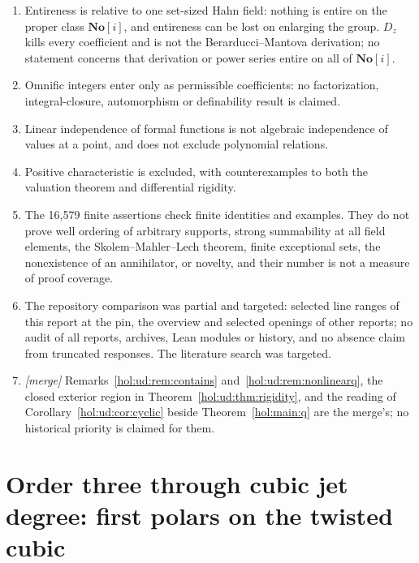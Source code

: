 \documentclass[11pt]{article}
\numberwithin{equation}{section}
\theoremstyle{definition}
\theoremstyle{remark}
\newcommand{\No}{\mathbf{No}}
\begin{document}
\begin{enumerate}[label=\textup{(U\arabic*)}]
operator data (Example~\ref{hol:ud:ex:degree}).
\item Entireness is relative to one set-sized Hahn field: nothing is entire on
the proper class $\No[i]$, and entireness can be lost on enlarging the group.
$D_z$ kills every coefficient and is not the Berarducci--Mantova derivation;
no statement concerns that derivation or power series entire on all of
$\No[i]$.
\item Omnific integers enter only as permissible coefficients: no
factorization, integral-closure, automorphism or definability result is
claimed.
\item Linear independence of formal functions is not algebraic independence
of values at a point, and does not exclude polynomial relations.
\item Positive characteristic is excluded, with counterexamples to both the
valuation theorem and differential rigidity.
\item The 16{,}579 finite assertions check finite identities and examples.
They do not prove well ordering of arbitrary supports, strong summability at
all field elements, the Skolem--Mahler--Lech theorem, finite exceptional sets,
the nonexistence of an annihilator, or novelty, and their number is not a
measure of proof coverage.
\item The repository comparison was partial and targeted: selected line
ranges of this report at the pin, the overview and selected openings of other
reports; no audit of all reports, archives, Lean modules or history, and no
absence claim from truncated responses. The literature search was targeted.
\item \emph{[merge]} Remarks~\ref{hol:ud:rem:contains}
and~\ref{hol:ud:rem:nonlinearq}, the closed exterior region in
Theorem~\ref{hol:ud:thm:rigidity}, and the reading of
Corollary~\ref{hol:ud:cor:cyclic} beside Theorem~\ref{hol:main:q} are the
merge's; no historical priority is claimed for them.
\end{enumerate}

\section{Order three through cubic jet degree: first polars on the twisted
cubic}\label{hol:nr:sec:setting}
\end{document}
